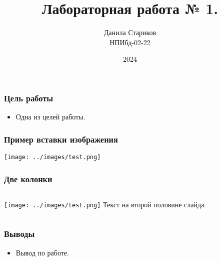 

\title{Лабораторная работа № 1. \\ [Название]}
\author{Данила Стариков \\ НПИбд-02-22}
\date{2024}



\frame{\titlepage}

\begin{frame}
\frametitle{Цель работы}
\begin{itemize}
    \item Одна из целей работы.
\end{itemize}
\end{frame}

\begin{frame}
\frametitle{Пример вставки изображения}
    \texttt{[image: ../images/test.png]}
\end{frame}

\begin{frame}
\frametitle{Две колонки}
\begin{columns}
        \texttt{[image: ../images/test.png]}
        Текст на второй половине слайда.
\end{columns}
\end{frame}

\begin{frame}
\frametitle{Выводы}
\begin{itemize}
    \item Вывод по работе.
\end{itemize}
\end{frame}

